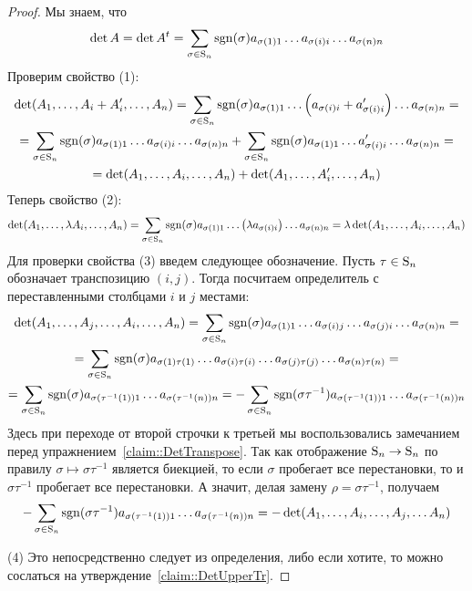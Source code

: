 \begin{proof}
Мы знаем, что 
\[
\det A = \det A^t = \sum_{\sigma\in\operatorname{S}_{n}}\operatorname{sgn}(\sigma)a_{\sigma(1)1} \ldots a_{\sigma(i)i}\ldots a_{\sigma(n)n}
\]
Проверим свойство (1):
\begin{gather*}
\det(A_1,\ldots, A_i + A_i', \ldots, A_n) = \sum_{\sigma\in\operatorname{S}_{n}}\operatorname{sgn}(\sigma)a_{\sigma(1)1} \ldots \left(a_{\sigma(i)i} + a_{\sigma(i)i}'\right)\ldots a_{\sigma(n)n}=\\
= \sum_{\sigma\in\operatorname{S}_{n}}\operatorname{sgn}(\sigma)a_{\sigma(1)1} \ldots a_{\sigma(i)i}\ldots a_{\sigma(n)n} +\sum_{\sigma\in\operatorname{S}_{n}}\operatorname{sgn}(\sigma)a_{\sigma(1)1} \ldots a_{\sigma(i)i}'\ldots a_{\sigma(n)n} =\\
= \det(A_1,\ldots, A_i, \ldots, A_n) + \det(A_1,\ldots,A_i', \ldots, A_n)
\end{gather*}
Теперь свойство (2):
\[
\det(A_1,\ldots, \lambda A_i, \ldots, A_n) = \sum_{\sigma\in\operatorname{S}_{n}}\operatorname{sgn}(\sigma)a_{\sigma(1)1} \ldots \left(\lambda a_{\sigma(i)i}\right)\ldots a_{\sigma(n)n}= \lambda \det(A_1,\ldots,  A_i, \ldots, A_n) 
\]
Для проверки свойства (3) введем следующее обозначение.
Пусть $\tau\in\operatorname{S}_{n}$ обозначает транспозицию $(i,j)$.
Тогда посчитаем определитель с переставленными столбцами $i$ и $j$ местами:
\begin{gather*}
\det (A_1,\ldots, A_j, \ldots, A_i, \ldots, A_n) = \sum_{\sigma\in\operatorname{S}_{n}}\operatorname{sgn}(\sigma) a_{\sigma(1)1}\ldots a_{\sigma(i)j}\ldots a_{\sigma(j)i}\ldots a_{\sigma(n)n} = \\
=  \sum_{\sigma\in\operatorname{S}_{n}}\operatorname{sgn}(\sigma) a_{\sigma(1)\tau(1)}\ldots a_{\sigma(i)\tau(i)}\ldots a_{\sigma(j)\tau(j)}\ldots a_{\sigma(n)\tau(n)} = \\
= \sum_{\sigma\in\operatorname{S}_{n}} \operatorname{sgn}(\sigma) a_{\sigma(\tau^{-1}(1))1} \ldots a_{\sigma(\tau^{-1}(n))n} = -\sum_{\sigma\in\operatorname{S}_{n}} \operatorname{sgn}(\sigma\tau^{-1}) a_{\sigma(\tau^{-1}(1))1} \ldots a_{\sigma(\tau^{-1}(n))n}
\end{gather*}
Здесь при переходе от второй строчки к третьей мы воспользовались замечанием перед упражнением~\ref{claim::DetTranspose}.
Так как отображение $\operatorname{S}_{n}\to \operatorname{S}_{n}$ по правилу $\sigma\mapsto \sigma \tau^{-1}$ является биекцией, то если $\sigma$ пробегает все перестановки, то и $\sigma\tau^{-1}$ пробегает все перестановки.
А значит, делая замену $\rho = \sigma \tau^{-1}$, получаем
\[
-\sum_{\sigma\in\operatorname{S}_{n}} \operatorname{sgn}(\sigma\tau^{-1}) a_{\sigma(\tau^{-1}(1))1} \ldots a_{\sigma(\tau^{-1}(n))n} = -\det (A_1,\ldots, A_i, \ldots, A_j,\ldots A_n)
\]

(4) Это непосредственно следует из определения, либо если хотите, то можно сослаться на утверждение~\ref{claim::DetUpperTr}.
\end{proof}

